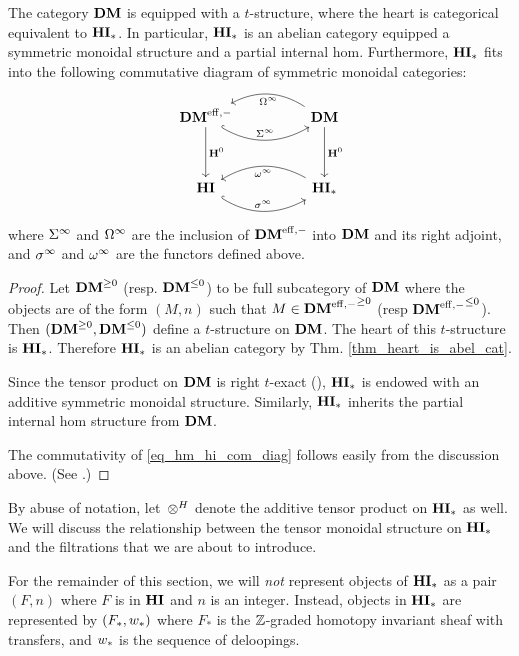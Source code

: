 \begin{prop}
The category $\mathbf{DM}$ is equipped with a $t$-structure, where the 
heart is categorical equivalent to $\mathbf{HI}_*$. In particular, $\mathbf{HI}_*$ is 
an abelian category equipped a symmetric monoidal structure and a 
partial internal hom. Furthermore, $\mathbf{HI}_*$ fits into the following 
commutative diagram of symmetric monoidal categories:
\begin{equation}\label{eq_hm_hi_com_diag}
\begin{tikzcd}[column sep=huge, row sep=huge]
\DMeff \arrow[hookrightarrow, bend right]{r}{\spectDM} \arrow{d}{\HH^0} &
\DM \arrow{d}{\HH^0} \arrow[bend right]{l}{\loopDM}\\
\HI \arrow[hookrightarrow, bend right]{r}{\spectHI} &
\HM \arrow[bend right]{l}{\loopHM}
\end{tikzcd}
\end{equation}
where $\Sigma^\infty$ and $\Omega^\infty$ are the inclusion of $\mathbf{DM}^{\mathrm{eff},-}$ into
$\mathbf{DM}$ and its right adjoint, and $\sigma^\infty$ and $\omega^\infty$ are the 
functors defined above.
\end{prop}
\begin{proof}
Let $\mathbf{DM}^{\geq 0}$ (resp. $\mathbf{DM}^{\leq 0}$) to be full 
subcategory of $\mathbf{DM}$ where the objects are of the form $(M, n)$
such that $M \in {\mathbf{DM}^{\mathrm{eff},-}}^{\geq 0}$ (resp ${\mathbf{DM}^{\mathrm{eff},-}}^{\leq 0}$).
Then $(\mathbf{DM}^{\geq 0}, \mathbf{DM}^{\leq 0})$ define a $t$-structure on
$\mathbf{DM}$. The heart of this $t$-structure is $\mathbf{HI}_*$. Therefore $\mathbf{HI}_*$
is an abelian category by Thm. \ref{thm_heart_is_abel_cat}.

Since the tensor product on $\mathbf{DM}$ is right $t$-exact 
(\cite[5.8]{DegModHom}), $\mathbf{HI}_*$ is endowed with an additive 
symmetric monoidal structure. Similarly, $\mathbf{HI}_*$ inherits the
partial internal hom structure from $\mathbf{DM}$.

The commutativity of \eqref{eq_hm_hi_com_diag} follows easily
from the discussion above. (See \cite[5.7]{DegModHom}.)
\end{proof}

By abuse of notation, let $\,\otimes^H$ denote the additive tensor 
product on $\mathbf{HI}_*$ as well. We will discuss the relationship between
the tensor monoidal structure on $\mathbf{HI}_*$ and the filtrations that 
we are about to introduce.

For the remainder of this section, we will \emph{not} represent 
objects of $\mathbf{HI}_*$ as a pair $(F, n)$ where $F$ is in $\mathbf{HI}$ and $n$ 
is an integer. Instead, objects in $\mathbf{HI}_*$ are represented by $(F_*, 
w_*)$ where $F_*$ is the $\mathbb{Z}$-graded homotopy invariant 
sheaf with transfers, and $w_*$ is the sequence of 
deloopings.

